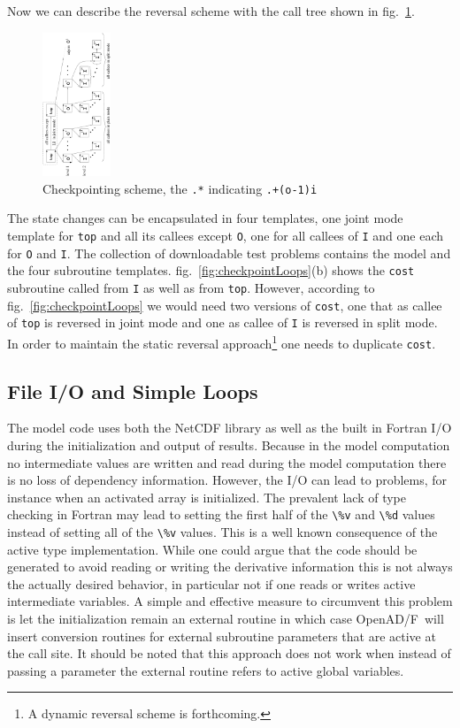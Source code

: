 \documentclass{book}
\newcommand{\OpenADF}{OpenAD/F}
\newcommand{\reffig}[1]{{fig.~\ref{#1}}}
\begin{document}
Now we can describe the reversal scheme with the call tree shown in \reffig{fig:checkpointct}.
\begin{figure}
\begin{center}
\includegraphics[height=4.3cm]{swMode}
\end{center}
\caption{Checkpointing scheme, the \lstinline{.*} indicating \lstinline{.+(o-1)i}} \label{fig:checkpointct}
\end{figure}
The state changes can be encapsulated in four templates, one joint mode template for \lstinline{top}
and all its callees except \lstinline{O}, one for all callees of \lstinline{I} and one  each for 
\lstinline{O} and \lstinline{I}.  
The collection of downloadable test problems contains the 
model and the four subroutine templates.
\reffig{fig:checkpointLoops}(b) shows the \lstinline{cost} subroutine called from 
\lstinline{I} as well as from \lstinline{top}. 
However, according to \reffig{fig:checkpointLoops} we would need two versions of 
\lstinline{cost}, one that as callee of \lstinline{top} is reversed in joint mode and 
one as callee of \lstinline{I} is reversed in split mode. In order to maintain 
the static reversal approach\footnote{
A dynamic reversal scheme is forthcoming.
}
one needs to duplicate \lstinline{cost}.

\subsection{File I/O and Simple Loops}
The model code uses both the NetCDF library as well as 
the built in Fortran I/O during the initialization and 
output of results. Because  in the model computation 
no intermediate values are written and read during 
the model computation there is no loss of dependency information. 
However, the I/O can lead to problems, for instance 
when an activated array is initialized. The prevalent 
lack of type checking in Fortran may lead to setting 
the first half of the \lstinline{\%v} and \lstinline{\%d} values 
instead of setting all of the \lstinline{\%v} values. 
This is a well known consequence of the active type 
implementation. While one could argue that the code should 
be generated to avoid reading or writing the derivative information
this is not always the actually desired behavior, in particular 
not if one reads or writes active intermediate variables. 
A simple and effective measure to circumvent this problem 
is let the initialization remain an external routine 
in which case \OpenADF\ will insert conversion routines 
for external subroutine parameters that are active at the 
call site. 
It should be noted that this approach does not work 
when instead of passing a parameter the external routine refers 
to active global variables.
  
\end{document}
